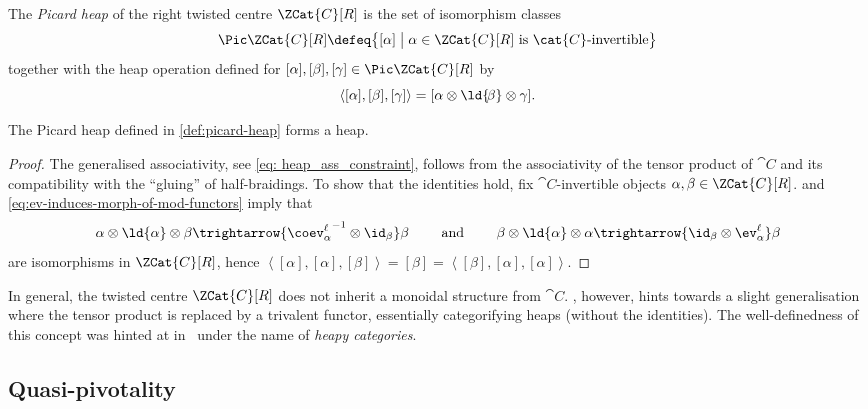 \begin{definition}\label{def:picard-heap}
  The \emph{Picard heap} of the right twisted centre \(\ZCat{C}[R]\) is the set of isomorphism classes
  \[
    \Pic \ZCat{C}[R] \defeq
    \big\{
    [\alpha]
    \;\big|\;
    \alpha \in \ZCat{C}[R] \text{ is }\cat{C}\text{-invertible}
    \big\}
  \]
  together with the heap operation defined for \([\alpha], [\beta], [\gamma] \in \Pic \ZCat{C}[R]\) by
  \[
    \left \langle [\alpha], [\beta] , [\gamma] \right \rangle = [\alpha \otimes \ld{\!\beta} \otimes \gamma] .
  \]
\end{definition}

\newpage%
\begin{lemma}\label{lem: inv_twisted_form_heap}
  The Picard heap defined in \cref{def:picard-heap} forms a heap.
\end{lemma}
\begin{proof}
  The generalised associativity, see \cref{eq: heap_ass_constraint},
  follows from the associativity of the tensor product of \(\cat{C}\) and its compatibility with the ``gluing'' of half-braidings.
  To show that the \Malcev{} identities hold, fix \(\cat{C}\)\hyp{}invertible objects \(\alpha, \beta \in \ZCat{C}[R]\).
   and \cref{eq:ev-induces-morph-of-mod-functors} imply that
  \[
    \alpha \otimes \ld{\alpha} \otimes \beta \trightarrow{{\coev^{\ell}_\alpha}^{-1}\otimes {\id_\beta}} \beta
    \qquad
    \text { and }
    \qquad
    \beta \otimes \ld{\alpha} \otimes \alpha \trightarrow{{\id_\beta} \otimes {\ev^{\ell}_\alpha}} \beta
  \]
  are isomorphisms in \(\ZCat{C}[R]\), hence
  \(\left \langle [\alpha], [\alpha] , [\beta] \right \rangle = [\beta] = \left \langle [\beta], [\alpha] , [\alpha] \right \rangle\).
\end{proof}

In general, the twisted centre \(\ZCat{C}[R]\) does not inherit a monoidal structure from \(\cat{C}\).
, however,
hints towards a slight generalisation where the tensor product is replaced by a trivalent functor,
essentially categorifying heaps (without the \Malcev{} identities).
The well-definedness of this concept was hinted at in~\cite{Skoda2007} under the name of \emph{heapy categories}.

\subsection{Quasi-pivotality}\label{subsec: quasi-pivotality}

